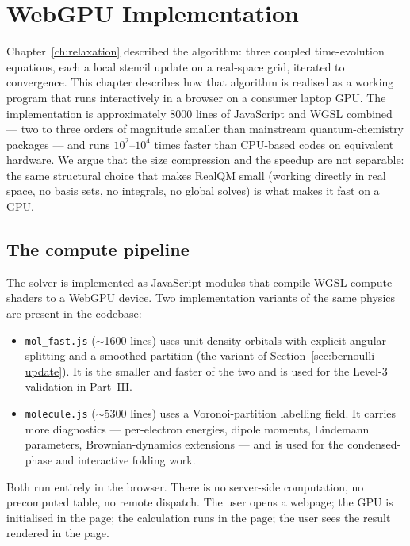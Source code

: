 \chapter{WebGPU Implementation}\label{ch:webgpu}

Chapter~\ref{ch:relaxation} described the algorithm: three coupled time-evolution equations, each a local stencil update on a real-space grid, iterated to convergence. This chapter describes how that algorithm is realised as a working program that runs interactively in a browser on a consumer laptop GPU. The implementation is approximately 8000 lines of JavaScript and WGSL combined --- two to three orders of magnitude smaller than mainstream quantum-chemistry packages --- and runs $10^2$--$10^4$ times faster than CPU-based codes on equivalent hardware. We argue that the size compression and the speedup are not separable: the same structural choice that makes RealQM small (working directly in real space, no basis sets, no integrals, no global solves) is what makes it fast on a GPU.

\section{The compute pipeline}\label{sec:pipeline}

The solver is implemented as JavaScript modules that compile WGSL compute shaders to a WebGPU device. Two implementation variants of the same physics are present in the codebase:

\begin{itemize}
\item \texttt{mol\_fast.js} ($\sim$1600 lines) uses unit-density orbitals with explicit angular splitting and a smoothed partition (the variant of Section~\ref{sec:bernoulli-update}). It is the smaller and faster of the two and is used for the Level-3 validation in Part~III.
\item \texttt{molecule.js} ($\sim$5300 lines) uses a Voronoi-partition labelling field. It carries more diagnostics --- per-electron energies, dipole moments, Lindemann parameters, Brownian-dynamics extensions --- and is used for the condensed-phase and interactive folding work.
\end{itemize}
Both run entirely in the browser. There is no server-side computation, no precomputed table, no remote dispatch. The user opens a webpage; the GPU is initialised in the page; the calculation runs in the page; the user sees the result rendered in the page.


